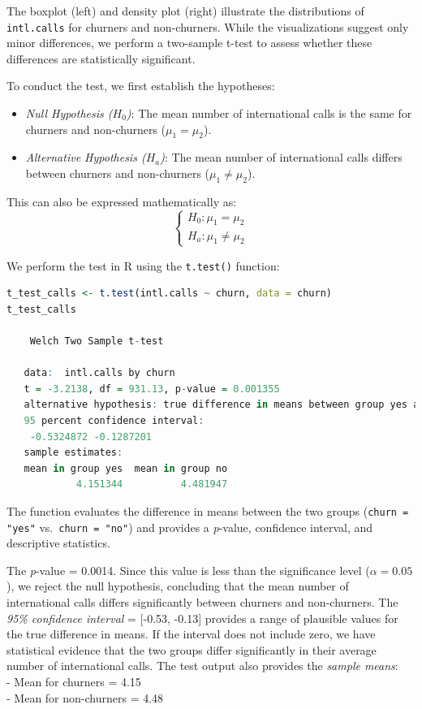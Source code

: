 \documentclass[
]{book}
\newcommand{\passthrough}[1]{#1}
\providecommand{\tightlist}{%
  \setlength{\itemsep}{0pt}\setlength{\parskip}{0pt}}
\theoremstyle{definition}
\theoremstyle{definition}
\theoremstyle{definition}
\theoremstyle{definition}
\theoremstyle{remark}
\begin{document}
The boxplot (left) and density plot (right) illustrate the distributions of \passthrough{\lstinline!intl.calls!} for churners and non-churners. While the visualizations suggest only minor differences, we perform a two-sample t-test to assess whether these differences are statistically significant.

To conduct the test, we first establish the hypotheses:

\begin{itemize}
\tightlist
\item
  \emph{Null Hypothesis (\(H_0\))}: The mean number of international calls is the same for churners and non-churners (\(\mu_1 = \mu_2\)).
\item
  \emph{Alternative Hypothesis (\(H_a\))}: The mean number of international calls differs between churners and non-churners (\(\mu_1 \neq \mu_2\)).
\end{itemize}

This can also be expressed mathematically as:
\[
\begin{cases}
    H_0: \mu_1 = \mu_2   \\
    H_a: \mu_1 \neq \mu_2 
\end{cases}
\]

We perform the test in R using the \passthrough{\lstinline!t.test()!} function:

\begin{lstlisting}[language=R]
t_test_calls <- t.test(intl.calls ~ churn, data = churn)
t_test_calls
   
    Welch Two Sample t-test
   
   data:  intl.calls by churn
   t = -3.2138, df = 931.13, p-value = 0.001355
   alternative hypothesis: true difference in means between group yes and group no is not equal to 0
   95 percent confidence interval:
    -0.5324872 -0.1287201
   sample estimates:
   mean in group yes  mean in group no 
            4.151344          4.481947
\end{lstlisting}

The function evaluates the difference in means between the two groups (\passthrough{\lstinline!churn = "yes"!} vs.~\passthrough{\lstinline!churn = "no"!}) and provides a \emph{p}-value, confidence interval, and descriptive statistics.

The \emph{p}-value = 0.0014. Since this value is less than the significance level (\(\alpha = 0.05\)), we reject the null hypothesis, concluding that the mean number of international calls differs significantly between churners and non-churners. The \emph{95\% confidence interval} = {[}-0.53, -0.13{]} provides a range of plausible values for the true difference in means. If the interval does not include zero, we have statistical evidence that the two groups differ significantly in their average number of international calls. The test output also provides the \emph{sample means}:\\
- Mean for churners = 4.15\\
- Mean for non-churners = 4.48
\end{document}
